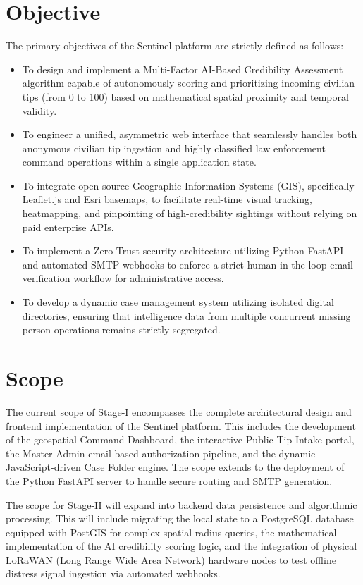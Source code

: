 \documentclass[12pt,a4paper]{report}
\begin{document}
\section{Objective}
The primary objectives of the Sentinel platform are strictly defined as follows:
\begin{itemize}
    \item To design and implement a Multi-Factor AI-Based Credibility Assessment algorithm capable of autonomously scoring and prioritizing incoming civilian tips (from 0 to 100) based on mathematical spatial proximity and temporal validity.
    \item To engineer a unified, asymmetric web interface that seamlessly handles both anonymous civilian tip ingestion and highly classified law enforcement command operations within a single application state.
    \item To integrate open-source Geographic Information Systems (GIS), specifically Leaflet.js and Esri basemaps, to facilitate real-time visual tracking, heatmapping, and pinpointing of high-credibility sightings without relying on paid enterprise APIs.
    \item To implement a Zero-Trust security architecture utilizing Python FastAPI and automated SMTP webhooks to enforce a strict human-in-the-loop email verification workflow for administrative access.
    \item To develop a dynamic case management system utilizing isolated digital directories, ensuring that intelligence data from multiple concurrent missing person operations remains strictly segregated.
\end{itemize}

\section{Scope}
The current scope of Stage-I encompasses the complete architectural design and frontend implementation of the Sentinel platform. This includes the development of the geospatial Command Dashboard, the interactive Public Tip Intake portal, the Master Admin email-based authorization pipeline, and the dynamic JavaScript-driven Case Folder engine. The scope extends to the deployment of the Python FastAPI server to handle secure routing and SMTP generation. 

The scope for Stage-II will expand into backend data persistence and algorithmic processing. This will include migrating the local state to a PostgreSQL database equipped with PostGIS for complex spatial radius queries, the mathematical implementation of the AI credibility scoring logic, and the integration of physical LoRaWAN (Long Range Wide Area Network) hardware nodes to test offline distress signal ingestion via automated webhooks.
\end{document}
